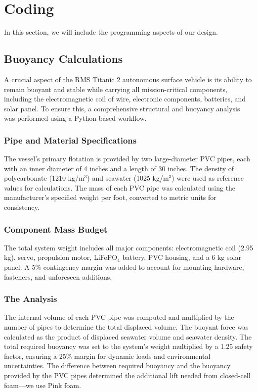 \section{Coding}

In this section, we will include the programming aspects of our design.

\subsection{Buoyancy Calculations}

A crucial aspect of the RMS Titanic 2 autonomous surface vehicle is its ability to remain buoyant and stable while carrying all mission-critical components, including the electromagnetic coil of wire, electronic components, batteries, and solar panel. To ensure this, a comprehensive structural and buoyancy analysis was performed using a Python-based workflow.

\subsubsection{Pipe and Material Specifications}

The vessel's primary flotation is provided by two large-diameter PVC pipes, each with an inner diameter of 4 inches and a length of 30 inches.
The density of polycarbonate (1210 kg/m$^3$) and seawater (1025 kg/m$^3$) were used as reference values for calculations.
The mass of each PVC pipe was calculated using the manufacturer's specified weight per foot, converted to metric units for consistency.

\subsubsection{Component Mass Budget}

The total system weight includes all major components: electromagnetic coil (2.95 kg), servo, propulsion motor, LiFePO$_4$ battery, PVC housing, and a 6 kg solar panel.
A 5\% contingency margin was added to account for mounting hardware, fasteners, and unforeseen additions.

\subsubsection{The Analysis}
The internal volume of each PVC pipe was computed and multiplied by the number of pipes to determine the total displaced volume.
The buoyant force was calculated as the product of displaced seawater volume and seawater density.
The total required buoyancy was set to the system's weight multiplied by a 1.25 safety factor, ensuring a 25\% margin for dynamic loads and environmental uncertainties.
The difference between required buoyancy and the buoyancy provided by the PVC pipes determined the additional lift needed from closed-cell foam---we use Pink foam.

